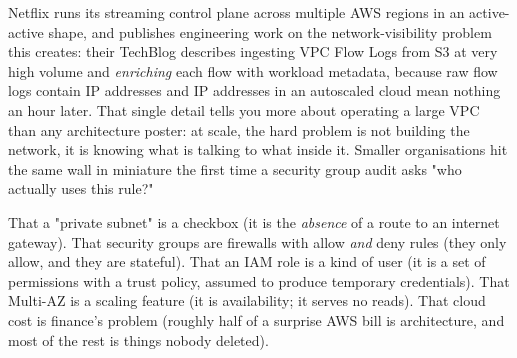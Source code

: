  Netflix runs its streaming control plane across multiple AWS regions in an active-active shape, and publishes engineering work on the network-visibility problem this creates: their TechBlog describes ingesting VPC Flow Logs from S3 at very high volume and \emph{enriching} each flow with workload metadata, because raw flow logs contain IP addresses and IP addresses in an autoscaled cloud mean nothing an hour later. That single detail tells you more about operating a large VPC than any architecture poster: at scale, the hard problem is not building the network, it is knowing what is talking to what inside it. Smaller organisations hit the same wall in miniature the first time a security group audit asks "who actually uses this rule?"

 That a "private subnet" is a checkbox (it is the \emph{absence} of a route to an internet gateway). That security groups are firewalls with allow \emph{and} deny rules (they only allow, and they are stateful). That an IAM role is a kind of user (it is a set of permissions with a trust policy, assumed to produce temporary credentials). That Multi-AZ is a scaling feature (it is availability; it serves no reads). That cloud cost is finance's problem (roughly half of a surprise AWS bill is architecture, and most of the rest is things nobody deleted).


